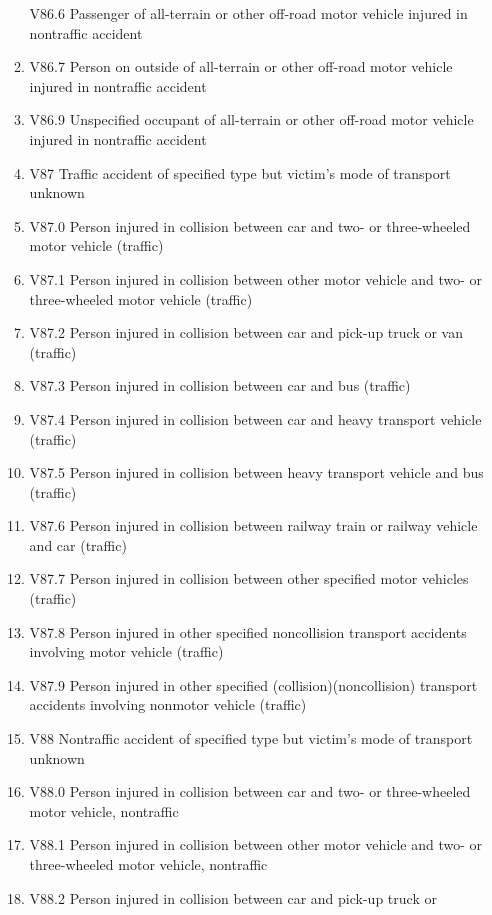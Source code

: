 \documentclass[
]{scrartcl}
\begin{document}
\begin{itemize}
\begin{enumerate}
    V86.6 Passenger of all-terrain or other off-road motor vehicle
    injured in nontraffic accident
  \item
    V86.7 Person on outside of all-terrain or other off-road motor
    vehicle injured in nontraffic accident
  \item
    V86.9 Unspecified occupant of all-terrain or other off-road motor
    vehicle injured in nontraffic accident
  \item
    V87 Traffic accident of specified type but victim's mode of
    transport unknown
  \item
    V87.0 Person injured in collision between car and two- or
    three-wheeled motor vehicle (traffic)
  \item
    V87.1 Person injured in collision between other motor vehicle and
    two- or three-wheeled motor vehicle (traffic)
  \item
    V87.2 Person injured in collision between car and pick-up truck or
    van (traffic)
  \item
    V87.3 Person injured in collision between car and bus (traffic)
  \item
    V87.4 Person injured in collision between car and heavy transport
    vehicle (traffic)
  \item
    V87.5 Person injured in collision between heavy transport vehicle
    and bus (traffic)
  \item
    V87.6 Person injured in collision between railway train or railway
    vehicle and car (traffic)
  \item
    V87.7 Person injured in collision between other specified motor
    vehicles (traffic)
  \item
    V87.8 Person injured in other specified noncollision transport
    accidents involving motor vehicle (traffic)
  \item
    V87.9 Person injured in other specified (collision)(noncollision)
    transport accidents involving nonmotor vehicle (traffic)
  \item
    V88 Nontraffic accident of specified type but victim's mode of
    transport unknown
  \item
    V88.0 Person injured in collision between car and two- or
    three-wheeled motor vehicle, nontraffic
  \item
    V88.1 Person injured in collision between other motor vehicle and
    two- or three-wheeled motor vehicle, nontraffic
  \item
    V88.2 Person injured in collision between car and pick-up truck or

\end{enumerate}
\end{itemize}
\end{document}
